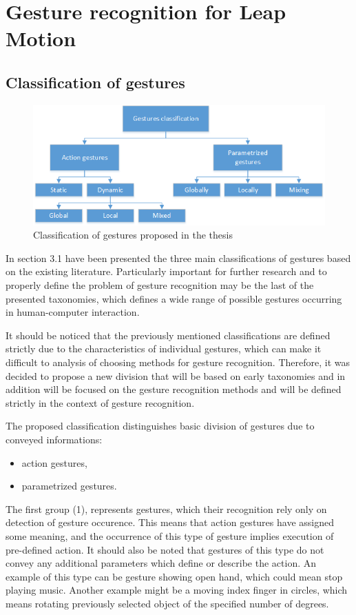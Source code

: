 \chapter{Gesture recognition for Leap Motion}

\section{Classification of gestures}

\begin{figure}[htb]
\centering
 \includegraphics[width=0.8\columnwidth]{figures/gestureClassification.png}
 \caption[]{Classification of gestures proposed in the thesis}
 \label{thesisgesturetypes}
\end{figure}

In section 3.1 have been presented the three main classifications of gestures based on the existing literature. Particularly important for further research and to properly define the problem of gesture recognition may be the last of the presented taxonomies, which defines a wide range of possible gestures occurring in human-computer interaction.

It should be noticed that the previously mentioned classifications are defined strictly due to the characteristics of individual gestures, which can make it difficult to analysis of choosing methods for gesture recognition. Therefore, it was decided to propose a new division that will be based on early taxonomies and in addition will be focused on the gesture recognition methods and will be defined strictly in the context of gesture recognition.

The proposed classification distinguishes basic division of gestures due to conveyed informations:
\begin{itemize}
\item action gestures,
\item parametrized gestures.
\end{itemize}

The first group (1), represents gestures, which their recognition rely only on detection of gesture occurence. This means that action gestures have assigned some meaning, and the occurrence of this type of gesture implies execution of pre-defined action. It should also be noted that gestures of this type do not convey any additional parameters which define or describe the action. An example of this type can be gesture showing open hand, which could mean stop playing music. Another example might be a moving index finger in circles, which means rotating previously selected object of the specified number of degrees.

